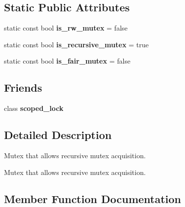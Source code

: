 \subsection*{Static Public Attributes}
\begin{DoxyCompactItemize}
\item 
\hypertarget{classtbb_1_1recursive__mutex_a668511b8520c41a342c038ba26ce70ff}{}static const bool {\bfseries is\+\_\+rw\+\_\+mutex} = false\label{classtbb_1_1recursive__mutex_a668511b8520c41a342c038ba26ce70ff}

\item 
\hypertarget{classtbb_1_1recursive__mutex_a2817cf2c1a7875590548f49a834ca668}{}static const bool {\bfseries is\+\_\+recursive\+\_\+mutex} = true\label{classtbb_1_1recursive__mutex_a2817cf2c1a7875590548f49a834ca668}

\item 
\hypertarget{classtbb_1_1recursive__mutex_abcc4a830c307cb4d25311550a527fe4d}{}static const bool {\bfseries is\+\_\+fair\+\_\+mutex} = false\label{classtbb_1_1recursive__mutex_abcc4a830c307cb4d25311550a527fe4d}

\end{DoxyCompactItemize}
\subsection*{Friends}
\begin{DoxyCompactItemize}
\item 
\hypertarget{classtbb_1_1recursive__mutex_afcf922650b2fd9d76b7b939d8511bbd8}{}class {\bfseries scoped\+\_\+lock}\label{classtbb_1_1recursive__mutex_afcf922650b2fd9d76b7b939d8511bbd8}

\end{DoxyCompactItemize}


\subsection{Detailed Description}
Mutex that allows recursive mutex acquisition. 

Mutex that allows recursive mutex acquisition. 

\subsection{Member Function Documentation}
\hypertarget{classtbb_1_1recursive__mutex_a8b181d9aaa95444145222cfe206e8094}{}
